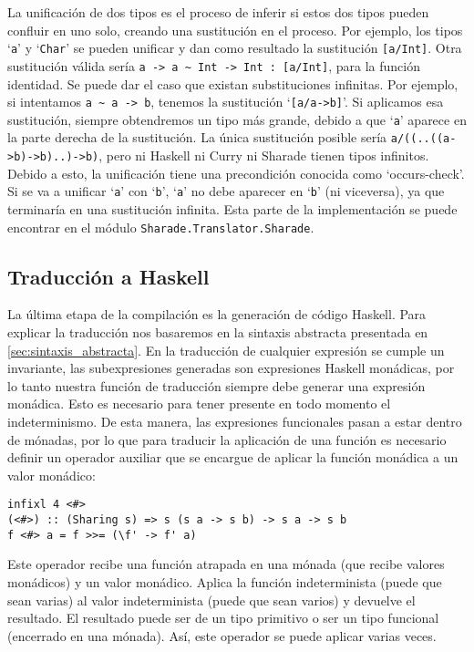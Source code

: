 \documentclass[class=article, crop=false]{standalone}
\begin{document}
La unificación de dos tipos es el proceso de inferir si estos dos tipos pueden confluir en
uno solo, creando una sustitución en el proceso. Por ejemplo, los tipos `\verb`a`' y
`\verb`Char`' se pueden unificar y dan como resultado la sustitución \verb`[a/Int]`. Otra
sustitución válida sería \verb`a -> a ~ Int -> Int : [a/Int]`, para la función identidad. Se
puede dar el caso que existan substituciones infinitas. Por ejemplo, si intentamos
\verb`a ~ a -> b`, tenemos la sustitución `\verb`[a/a->b]`'. Si aplicamos esa sustitución,
siempre obtendremos un tipo más grande, debido a que `\verb`a`' aparece en la parte derecha
de la sustitución. La única sustitución posible sería \verb`a/((..((a->b)->b)..)->b)`, pero
ni Haskell ni Curry ni Sharade tienen tipos infinitos. Debido a esto, la unificación tiene
una precondición conocida como `occurs-check'. Si se va a unificar `\verb`a`' con `\verb`b`',
`\verb`a`' no debe aparecer en `\verb`b`' (ni viceversa), ya que terminaría en una
sustitución infinita. Esta parte de la implementación se puede encontrar en el módulo
\verb`Sharade.Translator.Sharade`.

\subsection{Traducción a Haskell}\label{sec:traduccion}

La última etapa de la compilación es la generación de código Haskell. Para explicar la
traducción nos basaremos en la sintaxis abstracta presentada en \ref{sec:sintaxis_abstracta}.
En la traducción de cualquier expresión se cumple un invariante, las subexpresiones generadas
son expresiones Haskell monádicas, por lo tanto nuestra función de traducción siempre debe
generar una expresión monádica. Esto es necesario para tener presente en todo momento el
indeterminismo. De esta manera, las expresiones funcionales pasan a estar dentro de mónadas,
por lo que para traducir la aplicación de una función es necesario definir un operador
auxiliar que se encargue de aplicar la función monádica a un valor monádico:

\begin{verbatim}
infixl 4 <#>
(<#>) :: (Sharing s) => s (s a -> s b) -> s a -> s b
f <#> a = f >>= (\f' -> f' a)
\end{verbatim}

Este operador recibe una función atrapada en una mónada (que recibe valores monádicos) y un
valor monádico. Aplica la función indeterminista (puede que sean varias) al valor
indeterminista (puede que sean varios) y devuelve el resultado. El resultado puede ser de un
tipo primitivo o ser un tipo funcional (encerrado en una mónada). Así, este operador se puede
aplicar varias veces.
\end{document}
